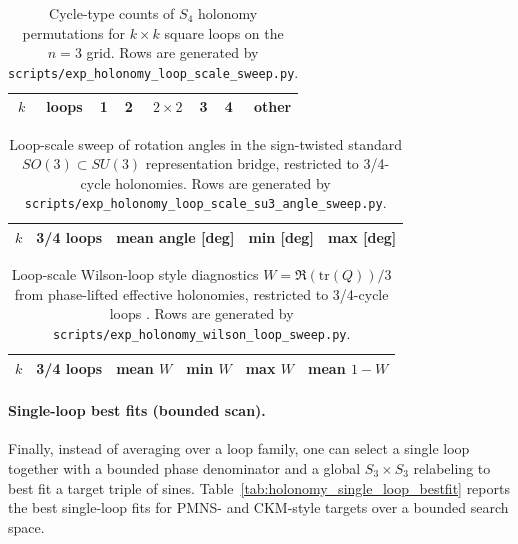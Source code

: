 \begin{table}[t]
\centering
\scriptsize
\setlength{\tabcolsep}{6pt}
\renewcommand{\arraystretch}{1.15}
\begin{tabular}{rrrrrrrr}
\toprule
$k$ & loops & 1 & 2 & $2\times 2$ & 3 & 4 & other \\
\midrule
%
\end{tabular}
\caption{Cycle-type counts of $S_4$ holonomy permutations for $k\times k$ square loops on the $n=3$ grid. Rows are generated by \texttt{scripts/exp\_holonomy\_loop\_scale\_sweep.py}.}
\label{tab:holonomy_loop_scale_cycle}
\end{table}

\begin{table}[t]
\centering
\scriptsize
\setlength{\tabcolsep}{8pt}
\renewcommand{\arraystretch}{1.15}
\begin{tabular}{rrrrr}
\toprule
$k$ & 3/4 loops & mean angle [deg] & min [deg] & max [deg] \\
\midrule
%
\end{tabular}
\caption{Loop-scale sweep of rotation angles in the sign-twisted standard $SO(3)\subset SU(3)$ representation bridge, restricted to 3/4-cycle holonomies. Rows are generated by \texttt{scripts/exp\_holonomy\_loop\_scale\_su3\_angle\_sweep.py}.}
\label{tab:holonomy_loop_scale_su3_angle}
\end{table}

\begin{table}[t]
\centering
\scriptsize
\setlength{\tabcolsep}{10pt}
\renewcommand{\arraystretch}{1.15}
\begin{tabular}{rrrrrr}
\toprule
$k$ & 3/4 loops & mean $W$ & min $W$ & max $W$ & mean $1-W$ \\
\midrule
%
\end{tabular}
\caption{Loop-scale Wilson-loop style diagnostics $W=\Re(\mathrm{tr}(Q))/3$ from phase-lifted effective holonomies, restricted to 3/4-cycle loops \cite{Wilson1974,Rothe2012}. Rows are generated by \texttt{scripts/exp\_holonomy\_wilson\_loop\_sweep.py}.}
\label{tab:holonomy_wilson_loop}
\end{table}

\paragraph{Single-loop best fits (bounded scan).}
Finally, instead of averaging over a loop family, one can select a single loop together with a bounded phase denominator and a global $S_3\times S_3$ relabeling to best fit a target triple of sines.
Table~\ref{tab:holonomy_single_loop_bestfit} reports the best single-loop fits for PMNS- and CKM-style targets over a bounded search space.

